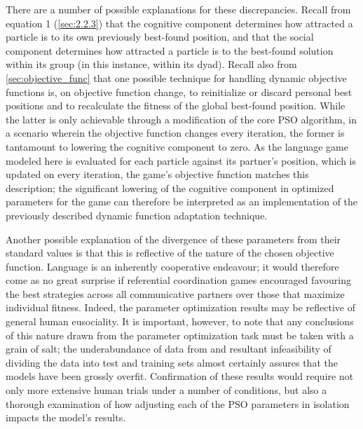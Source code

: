 \documentclass[11pt]{article}
\begin{document}
There are a number of possible explanations for these discrepancies. Recall from   
equation 1 (\ref{sec:2.2.3}) that the cognitive component determines how attracted a particle is to its own previously best-found position, and that the social component determines how attracted a particle is to the best-found solution within its group (in this instance, within its dyad). Recall also from \ref{sec:objective_func} that one possible technique for handling dynamic objective functions is, on objective function change, to reinitialize or discard personal best positions and to recalculate the fitness of the global best-found position. While the latter is only achievable through a modification of the core PSO algorithm, in a scenario wherein the objective function changes every iteration, the former is tantamount to lowering the cognitive component to zero. As the language game modeled here is evaluated for each particle against its partner's position, which is updated on every iteration, the game's objective function matches this description; the significant lowering of the cognitive component in optimized parameters for the game can therefore be interpreted as an implementation of the previously described dynamic function adaptation technique.

Another possible explanation of the divergence of these parameters from their standard values is that this is reflective of the nature of the chosen objective function. Language is an inherently cooperative endeavour; it would therefore come as no great surprise if referential coordination games encouraged favouring the best strategies across all communicative partners over those that maximize individual fitness. Indeed, the parameter optimization results may be reflective of general human eusociality. It is important, however, to note that any conclusions of this nature drawn from the parameter optimization task must be taken with a grain of salt; the underabundance of data from \citeauthor{rohde2012} and resultant infeasibility of dividing the data into test and training sets almost certainly assures that the models have been grossly overfit. Confirmation of these results would require not only more extensive human trials under a number of conditions, but also a thorough examination of how adjusting each of the PSO parameters in isolation impacts the model's results.
\end{document}
